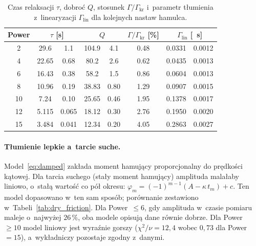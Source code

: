\documentclass[12pt, a4paper]{article}
\begin{document}
\begin{table}[H]
    \centering
    \caption{Czas relaksacji $\tau$, dobroć $Q$, stosunek $\Gamma/\Gamma_\text{kr}$
             i~parametr tłumienia z~linearyzacji $\Gamma_\text{lin}$ dla kolejnych
             nastaw hamulca.}\label{tab:decay_derived}
    \begin{tabular}{S[table-format=2.0]
                    S[table-format=2.3]@{\,$\pm$\,}S[table-format=1.3]
                    S[table-format=3.2]@{\,$\pm$\,}S[table-format=1.2]
                    S[table-format=1.2]
                    S[table-format=1.4]@{\,$\pm$\,}S[table-format=1.4]}
        \toprule
        {Power} &  & 
        & {$\Gamma/\Gamma_\text{kr}$ [\%]}
        &  \\
         & 29.6 & 1.1 & 104.9 & 4.1 & 0.48 & 0.0331 & 0.0012 \\
        4 & 22.65 & 0.68 & 80.2 & 2.6 & 0.62 & 0.0435 & 0.0013 \\
        6 & 16.43 & 0.38 & 58.2 & 1.5 & 0.86 & 0.0604 & 0.0013 \\
        8 & 10.96 & 0.19 & 38.83 & 0.80 & 1.29 & 0.0907 & 0.0015 \\
        10 & 7.24 & 0.10 & 25.65 & 0.46 & 1.95 & 0.1378 & 0.0017 \\
        12 & 5.115 & 0.065 & 18.12 & 0.30 & 2.76 & 0.1950 & 0.0020 \\
        15 & 3.484 & 0.041 & 12.34 & 0.20 & 4.05 & 0.2863 & 0.0027 \\
        \bottomrule
    \end{tabular}
\end{table}

\paragraph{Tłumienie lepkie a~tarcie suche.}
Model~\eqref{eq:damped} zakłada moment hamujący proporcjonalny do prędkości kątowej.
Dla tarcia suchego (stały moment hamujący) amplituda malałaby liniowo, o~stałą wartość
co pół okresu: $\varphi_m = (-1)^{m-1}(A - \kappa\,t_m) + c$. Ten model dopasowano
w~ten sam sposób; porównanie zestawiono w~Tabeli~\ref{tab:dry_friction}.
Dla Power~$\leq 6$, gdy amplituda w~czasie pomiaru maleje o~najwyżej $26\,\%$,
oba modele opisują dane równie dobrze. Dla Power~$\geq 10$ model liniowy jest
wyraźnie gorszy ($\chi^2/\nu = 12{,}4$ wobec $0{,}73$ dla Power~$=15$), a~wykładniczy
pozostaje zgodny z~danymi.
\end{document}
